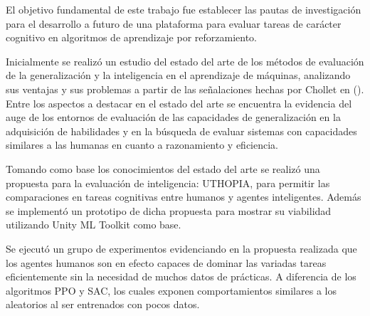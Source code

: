 \begin{conclusions}
    
    El objetivo fundamental de este trabajo fue establecer las pautas de investigación para el desarrollo a futuro de una plataforma para evaluar tareas de carácter cognitivo en algoritmos de aprendizaje por reforzamiento.
    
    Inicialmente se realizó un estudio del estado del arte de los métodos de evaluación de la generalización y la inteligencia en el aprendizaje de máquinas, analizando sus ventajas y sus problemas a partir de las señalaciones hechas por Chollet en (\cite{chollet2019measure}). Entre los aspectos a destacar en el estado del arte se encuentra la evidencia del auge de los entornos de evaluación de las capacidades de generalización en la adquisición de habilidades y en la búsqueda de evaluar sistemas con capacidades similares a las humanas en cuanto a razonamiento y eficiencia.
    
    Tomando como base los conocimientos del estado del arte se realizó una propuesta para la evaluación de inteligencia: UTHOPIA, para permitir las comparaciones en tareas cognitivas entre humanos y agentes inteligentes. Además se implementó un prototipo de dicha propuesta para mostrar su viabilidad utilizando Unity ML Toolkit como base.
    
    Se ejecutó un grupo de experimentos evidenciando en la propuesta realizada que los agentes humanos son en efecto capaces de dominar las variadas tareas eficientemente sin la necesidad de muchos datos de prácticas. A diferencia de los algoritmos PPO y SAC, los cuales exponen comportamientos similares a los aleatorios al ser entrenados con pocos datos. 
    
    \end{conclusions}
    
    
